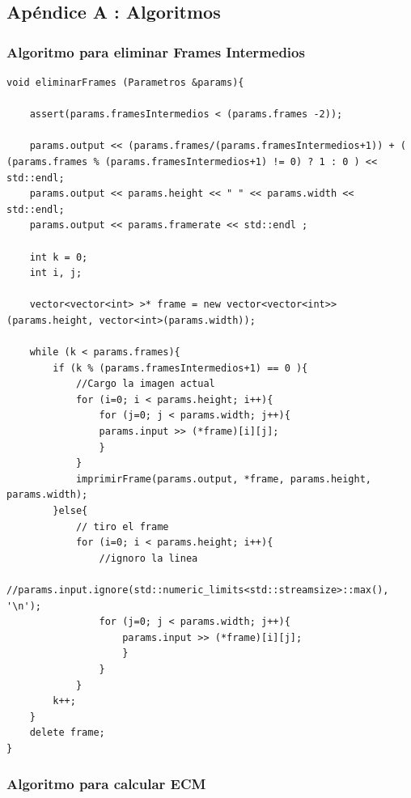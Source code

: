 \subsection{Apéndice A : Algoritmos}

\subsubsection{Algoritmo para eliminar Frames Intermedios} \label{eliminarframes}

\lstset{language=C++, breaklines=true, basicstyle=\footnotesize}
\begin{lstlisting}[frame=single]
void eliminarFrames (Parametros &params){

	assert(params.framesIntermedios < (params.frames -2));

	params.output << (params.frames/(params.framesIntermedios+1)) + ( (params.frames % (params.framesIntermedios+1) != 0) ? 1 : 0 ) << std::endl;
	params.output << params.height << " " << params.width << std::endl;
	params.output << params.framerate << std::endl ;

	int k = 0;
	int i, j;

	vector<vector<int> >* frame = new vector<vector<int>>(params.height, vector<int>(params.width));

	while (k < params.frames){
		if (k % (params.framesIntermedios+1) == 0 ){
			//Cargo la imagen actual
			for (i=0; i < params.height; i++){
				for (j=0; j < params.width; j++){
				params.input >> (*frame)[i][j];
				}
			}
			imprimirFrame(params.output, *frame, params.height, params.width);
		}else{
			// tiro el frame
			for (i=0; i < params.height; i++){
				//ignoro la linea
				//params.input.ignore(std::numeric_limits<std::streamsize>::max(), '\n');
				for (j=0; j < params.width; j++){
					params.input >> (*frame)[i][j];
					}
				}
			}
		k++;
	}
	delete frame;
}
\end{lstlisting}

\subsubsection{Algoritmo para calcular ECM} \label{ecmalgo}

